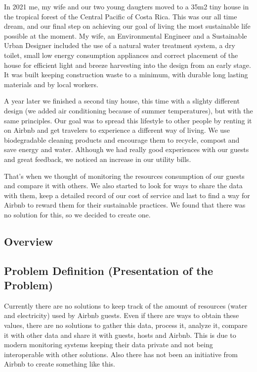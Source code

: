 \documentclass[12pt]{extarticle}
\begin{document}
In 2021 me, my wife and our two young daugters moved to a 35m2 tiny house in the tropical forest of the Central Pacific of Costa Rica. This was our all time dream, and our final step on
achieving our goal of living the most sustainable life possible at the moment. My wife, an Environmental Engineer and a Sustainable Urban Designer included the use of a
natural water treatment system, a dry toilet, small low energy consumption appliances and correct placement of the house for efficient light and breeze harvesting into the design from
an early stage. It was built keeping construction waste to a minimum, with durable long lasting materials and by local workers. 

A year later we finished a second tiny house, this time with a slighty different design (we added air conditioning because of summer temperatures), but with the same principles. 
Our goal was to spread this lifestyle to other people by renting it on Airbnb and get travelers to experience a different way of living. We use biodegradable cleaning products and 
encourage them to recycle, compost and save energy and water. Although we had really good experiences with our guests and great feedback, we noticed an increase in our utility bills.

That's when we thought of monitoring the resources consumption of our guests and compare it with others. We also started to look for ways to share the data with them, keep a detailed 
record of our cost of service and last to find a way for Airbnb to reward them for their sustainable practices. We found that there was no solution for this, so we decided to create one.

\subsection{Overview}

\subsection{Problem Definition (Presentation of the Problem)}

Currently there are no solutions to keep track of the amount of resources (water and electricity) used by Airbnb guests. Even if there are ways to obtain these values, there are no solutions 
to gather this data, process it, analyze it, compare it with other data and share it with guests, hosts and Airbnb. This is due to modern monitoring systems keeping their data private and 
not being interoperable with other solutions. Also there has not been an initiative from Airbnb to create something like this.
\end{document}
